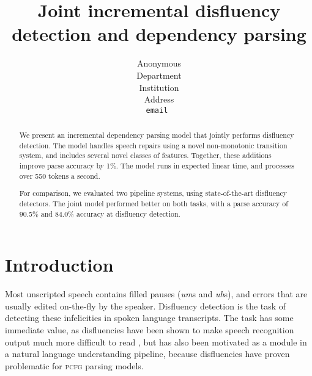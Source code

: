 \documentclass[11pt,letterpaper]{article}
\title{Joint incremental disfluency detection and dependency parsing}
\author{
	Anonymous\\
  	Department\\
  	Institution\\
  	Address\\
  {\tt \small email }\\
}
\date{}
\newcommand{\pcfg}{\textsc{pcfg}\xspace}
\begin{document}
\maketitle
\begin{abstract}

We present an incremental dependency parsing model that jointly performs
disfluency detection.  The model handles speech repairs using a novel non-monotonic
transition system, and includes several novel classes of features.  Together, these
additions improve parse accuracy by 1\%.  The model runs in expected linear time,
and processes over 550 tokens a second.

For comparison, we evaluated two pipeline systems, using state-of-the-art disfluency
detectors.  The joint model performed better on both tasks,
with a parse accuracy of 90.5\% and 84.0\% accuracy at disfluency detection.

\end{abstract}

\section{Introduction}

Most unscripted speech contains filled pauses (\emph{um}s and \emph{uh}s), and
errors that are usually edited on-the-fly by the speaker. Disfluency detection
is the task of detecting these infelicities in spoken language transcripts. The
task has some immediate value, as disfluencies have been shown to make speech
recognition output much more difficult to read \citep{jones:03}, but has also
been motivated as a module in a natural language understanding pipeline, because
disfluencies have proven problematic for \pcfg parsing models.


\end{document}
